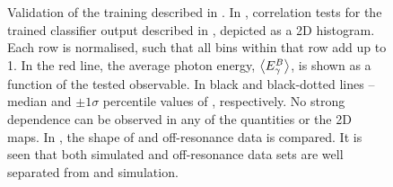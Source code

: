 \begin{figure}[htbp!]
    \centering
    \caption{\label{fig:bdt_validation} 
    Validation of the training described in .
    In , correlation tests for the trained classifier output described in , depicted as a 2D histogram.
    Each row is normalised, such that all bins within that row add up to 1.
    In the red line, the average photon energy, $\expval{{\ensuremath{E^B_{\gamma}}}}$, is shown as a function of the tested observable.
    In black and black-dotted lines -- median and $\pm 1 \sigma$ percentile values of \EB, respectively.
    No strong dependence can be observed in any of the quantities or the 2D maps.
    In , the shape of \epem\ra\qqbar and off-resonance data is compared.
    It is seen that both simulated and off-resonance data sets are well separated from \BB and \BtoXsgamma simulation.
    }
\end{figure}